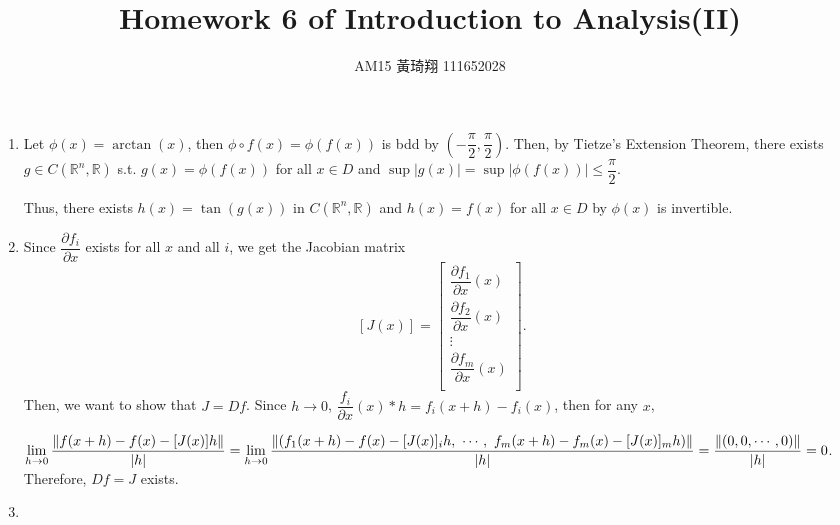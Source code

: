 \documentclass[12pt]{article}
\title{Homework 6 of Introduction to Analysis(II)}
\author{AM15 黃琦翔 111652028}
\begin{document}
\maketitle
\begin{enumerate}
    \item Let $\phi(x) = \arctan(x)$, then $\phi \circ f(x) = \phi(f(x))$ is bdd by $(-\dfrac{\pi}{2}, \dfrac{\pi}{2})$.
    Then, by Tietze's Extension Theorem, there exists $g \in C(\mathbb{R}^n, \mathbb{R})$ s.t. 
    $g(x) = \phi(f(x))$ for all $x\in D$ and $\sup|g(x)| = \sup |\phi(f(x))|\leq \dfrac{\pi}{2}$.

    Thus, there exists $h(x) = \tan(g(x))$ in $C(\mathbb{R}^n, \mathbb{R})$ and $h(x) = f(x)$ for all $x\in D$ by 
    $\phi(x)$ is invertible.

    \item Since $\dfrac{\partial f_i}{\partial x}$ exists for all $x$ and all $i$, 
    we get the Jacobian matrix $$\left[J(x)\right] = \begin{bmatrix}
        \dfrac{\partial f_1}{\partial x}(x)\\
        \dfrac{\partial f_2}{\partial x}(x)\\
        \vdots\\
        \dfrac{\partial f_m}{\partial x}(x)\\
    \end{bmatrix}.$$
    Then, we want to show that $J = Df$.
    Since $h \to 0$, $\dfrac{f_i}{\partial x}(x)*h = f_i(x+h) - f_i(x)$, then for any $x$, 

    $\displaystyle\lim_{h\to 0} \dfrac{\| f(x+h) - f(x) - [J(x)]h\|}{|h|}= \displaystyle\lim_{h\to 0} \dfrac{\| (f_1(x+h) - f(x) - [J(x)]_i h,\ \cdots,\ f_m(x+h) - f_m(x) - [J(x)]_m h)\|}{|h|}\\
    = \dfrac{\| (0, 0, \cdots, 0)\|}{|h|} = 0$.
    Therefore, $Df = J$ exists.

    \item 
\end{enumerate}
\end{document}
